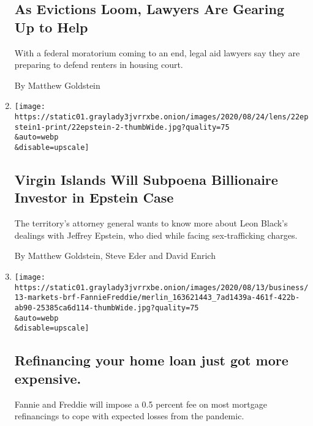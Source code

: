 \begin{enumerate}
  \hypertarget{as-evictions-loom-lawyers-are-gearing-up-to-help}{%
  \subsection{As Evictions Loom, Lawyers Are Gearing Up to
  Help}\label{as-evictions-loom-lawyers-are-gearing-up-to-help}}

  With a federal moratorium coming to an end, legal aid lawyers say they
  are preparing to defend renters in housing court.

  By Matthew Goldstein
\item
  \href{/2020/08/23/business/jeffrey-epstein-leon-black-virgin-islands.html}{}

  \texttt{[image: https://static01.graylady3jvrrxbe.onion/images/2020/08/24/lens/22epstein1-print/22epstein-2-thumbWide.jpg?quality=75\\\&auto=webp\\\&disable=upscale]}

  \hypertarget{virgin-islands-will-subpoena-billionaire-investor-in-epstein-case}{%
  \subsection{Virgin Islands Will Subpoena Billionaire Investor in
  Epstein
  Case}\label{virgin-islands-will-subpoena-billionaire-investor-in-epstein-case}}

  The territory's attorney general wants to know more about Leon Black's
  dealings with Jeffrey Epstein, who died while facing sex-trafficking
  charges.

  By Matthew Goldstein, Steve Eder and David Enrich
\item
  \href{/live/2020/08/13/business/stock-market-today-coronavirus/refinancing-your-home-loan-just-got-more-expensive}{}

  \texttt{[image: https://static01.graylady3jvrrxbe.onion/images/2020/08/13/business/13-markets-brf-FannieFreddie/merlin\_163621443\_7ad1439a-461f-422b-ab90-25385ca6d114-thumbWide.jpg?quality=75\\\&auto=webp\\\&disable=upscale]}

  \hypertarget{refinancing-your-home-loan-just-got-more-expensive}{%
  \subsection{Refinancing your home loan just got more
  expensive.}\label{refinancing-your-home-loan-just-got-more-expensive}}

  Fannie and Freddie will impose a 0.5 percent fee on most mortgage
  refinancings to cope with expected losses from the pandemic.


\end{enumerate}
